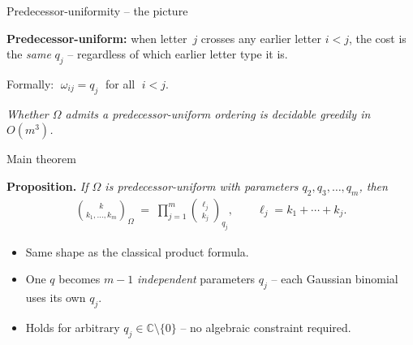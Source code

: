 \documentclass{beamer}
\renewcommand{\>}{\rangle}
\newcommand{\<}{\langle}
\newcommand{\C}{\mathbb{C}}
\begin{document}
\begin{frame}{Predecessor-uniformity -- the picture}

\begin{center}
\end{center}

\bigskip
\textbf{Predecessor-uniform:} when letter~$j$ crosses any earlier letter
$i<j$, the cost is the \emph{same} $q_j$ -- regardless of which earlier
letter type it is.

\medskip
Formally: $\;\omega_{ij} = q_j\;$ for all $\;i < j$.

\medskip
\emph{Whether $\Omega$ admits a predecessor-uniform ordering is decidable greedily in $O(m^3)$.}
\end{frame}


\begin{frame}{Main theorem}

\textbf{Proposition.}
\emph{If $\Omega$ is predecessor-uniform with parameters $q_2, q_3, \ldots, q_m$, then}
\begin{align*}
    \binom{k}{k_1,\dots,k_m}_\Omega
    \;=\;
    \prod_{j=1}^m \binom{\ell_j}{k_j}_{q_j},
    \qquad
    \ell_j = k_1+\cdots+k_j.
\end{align*}

\bigskip\bigskip
\begin{itemize}
    \item Same shape as the classical product formula.

    \medskip
    \item One $q$ becomes $m{-}1$ \emph{independent} parameters $q_j$
    -- each Gaussian binomial uses its own $q_j$.

    \medskip
    \item Holds for arbitrary $q_j\in\C\setminus\{0\}$ -- no algebraic
    constraint required.
\end{itemize}
\end{frame}
\end{document}
